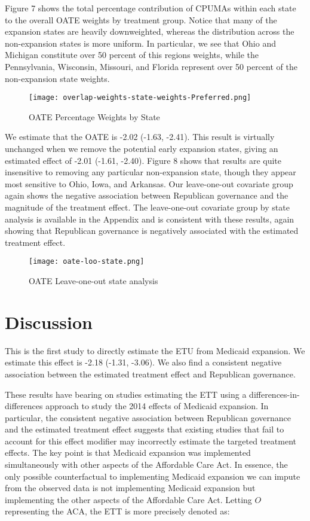 \documentclass[final]{article}
\begin{document}
Figure 7 shows the total percentage contribution of CPUMAs within each state to the overall OATE weights by treatment group. Notice that many of the expansion states are heavily downweighted, whereas the distribution across the non-expansion states is more uniform. In particular, we see that Ohio and Michigan constitute over 50 percent of this regions weights, while the Pennsylvania, Wisconsin, Missouri, and Florida represent over 50 percent of the non-expansion state weights.

\begin{figure}
    \texttt{[image: overlap-weights-state-weights-Preferred.png]}
    \caption{OATE Percentage Weights by State}
\end{figure}


We estimate that the OATE is -2.02 (-1.63, -2.41). This result is virtually unchanged when we remove the potential early expansion states, giving an estimated effect of -2.01 (-1.61, -2.40). Figure 8 shows that results are quite insensitive to removing any particular non-expansion state, though they appear most sensitive to Ohio, Iowa, and Arkansas. Our leave-one-out covariate group again shows the negative association between Republican governance and the magnitude of the treatment effect. The leave-one-out covariate group by state analysis is available in the Appendix and is consistent with these results, again showing that Republican governance is negatively associated with the estimated treatment effect.

\begin{figure}
    \texttt{[image: oate-loo-state.png]}
    \caption{OATE Leave-one-out state analysis}
\end{figure}

\section{Discussion}

This is the first study to directly estimate the ETU from Medicaid expansion. We estimate this effect is -2.18 (-1.31, -3.06). We also find a consistent negative association between the estimated treatment effect and Republican governance. 

These results have bearing on studies estimating the ETT using a differences-in-differences approach to study the 2014 effects of Medicaid expansion. In particular, the consistent negative association between Republican governance and the estimated treatment effect suggests that existing studies that fail to account for this effect modifier may incorrectly estimate the targeted treatment effects. The key point is that Medicaid expansion was implemented simultaneously with other aspects of the Affordable Care Act. In essence, the only possible counterfactual to implementing Medicaid expansion we can impute from the observed data is not implementing Medicaid expansion but implementing the other aspects of the Affordable Care Act. Letting $O$ representing the ACA, the ETT is more precisely denoted as:
\end{document}
